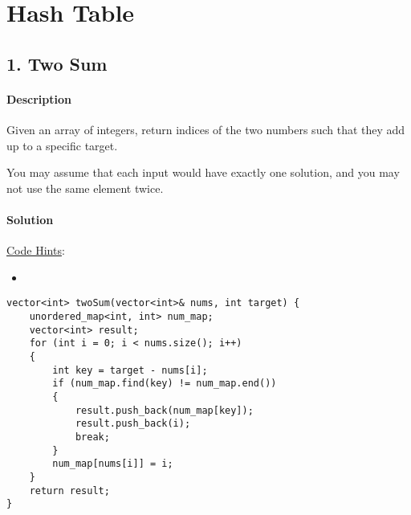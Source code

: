 \section{Hash Table}

\subsection{1. Two Sum}

\paragraph{Description}

Given an array of integers, return indices of the two numbers such that they add up to a specific target.

You may assume that each input would have exactly one solution, and you may not use the same element twice.

\paragraph{Solution}

\underline{Code Hints}:
\begin{itemize}
    \item 
\end{itemize}

\begin{verbatim}
vector<int> twoSum(vector<int>& nums, int target) {
    unordered_map<int, int> num_map;
    vector<int> result;
    for (int i = 0; i < nums.size(); i++)
    {
        int key = target - nums[i];
        if (num_map.find(key) != num_map.end())
        {
            result.push_back(num_map[key]);
            result.push_back(i);
            break;
        }
        num_map[nums[i]] = i;
    }
    return result;
}
\end{verbatim}